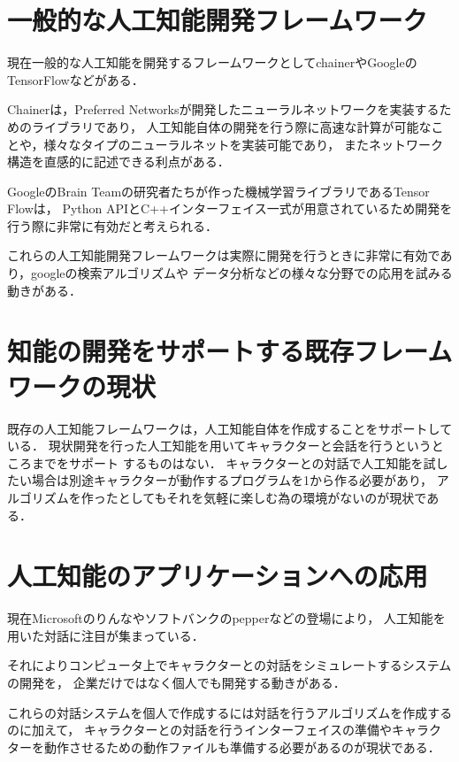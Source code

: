 \section{一般的な人工知能開発フレームワーク}
現在一般的な人工知能を開発するフレームワークとしてchainerやGoogleのTensorFlowなどがある．

Chainerは，Preferred Networksが開発したニューラルネットワークを実装するためのライブラリであり，
人工知能自体の開発を行う際に高速な計算が可能なことや，様々なタイプのニューラルネットを実装可能であり，
またネットワーク構造を直感的に記述できる利点がある．

GoogleのBrain Teamの研究者たちが作った機械学習ライブラリであるTensor Flowは，
Python APIとC++インターフェイス一式が用意されているため開発を行う際に非常に有効だと考えられる．

これらの人工知能開発フレームワークは実際に開発を行うときに非常に有効であり，googleの検索アルゴリズムや
データ分析などの様々な分野での応用を試みる動きがある．

\section{知能の開発をサポートする既存フレームワークの現状}
既存の人工知能フレームワークは，人工知能自体を作成することをサポートしている．
現状開発を行った人工知能を用いてキャラクターと会話を行うというところまでをサポート
するものはない．
キャラクターとの対話で人工知能を試したい場合は別途キャラクターが動作するプログラムを1から作る必要があり，
アルゴリズムを作ったとしてもそれを気軽に楽しむ為の環境がないのが現状である．

\section{人工知能のアプリケーションへの応用}
現在Microsoftのりんな\cite{rinna}やソフトバンクのpepper\cite{pepper}などの登場により，
人工知能を用いた対話に注目が集まっている．

それによりコンピュータ上でキャラクターとの対話をシミュレートするシステムの開発を，
企業だけではなく個人でも開発する動きがある．

これらの対話システムを個人で作成するには対話を行うアルゴリズムを作成するのに加えて，
キャラクターとの対話を行うインターフェイスの準備やキャラクターを動作させるための動作ファイルも準備する必要があるのが現状である．
